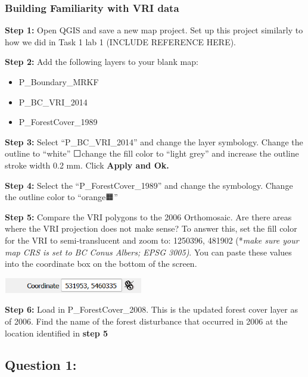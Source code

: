\documentclass[
  letterpaper,
]{book}
\providecommand{\tightlist}{%
  \setlength{\itemsep}{0pt}\setlength{\parskip}{0pt}}\usepackage{longtable,booktabs,array}
\begin{document}
\hypertarget{building-familiarity-with-vri-data}{%
\subsubsection*{Building Familiarity with VRI
data}\label{building-familiarity-with-vri-data}}

\textbf{Step 1:} Open QGIS and save a new map project. Set up this
project similarly to how we did in Task 1 lab 1 (INCLUDE REFERENCE
HERE).

\textbf{Step 2:} Add the following layers to your blank map:

\begin{itemize}
\tightlist
\item
  P\_Boundary\_MRKF
\item
  P\_BC\_VRI\_2014
\item
  P\_ForestCover\_1989
\end{itemize}

\textbf{Step 3:} Select ``P\_BC\_VRI\_2014'' and change the layer
symbology. Change the outline to ``white'' ⬜change the fill color to
``light grey'' and increase the outline stroke width 0.2 mm. Click
\textbf{Apply and Ok.}

\textbf{Step 4:} Select the ``P\_ForestCover\_1989'' and change the
symbology. Change the outline color to ``orange🟧''

\textbf{Step 5:} Compare the VRI polygons to the 2006 Orthomosaic. Are
there areas where the VRI projection does not make sense? To answer
this, set the fill color for the VRI to semi-translucent and zoom to:
1250396, 481902 (*\emph{make sure your map CRS is set to BC Conus
Albers; EPSG 3005)}. You can paste these values into the coordinate box
on the bottom of the screen.

\includegraphics[width=2.39583in,height=0.26042in]{images/clipboard-2547981647.png}

\textbf{Step 6:} Load in P\_ForestCover\_2008. This is the updated
forest cover layer as of 2006. Find the name of the forest disturbance
that occurred in 2006 at the location identified in \textbf{step 5}

\hypertarget{question-1-1}{%
\subsection{Question 1:}\label{question-1-1}}
\end{document}
